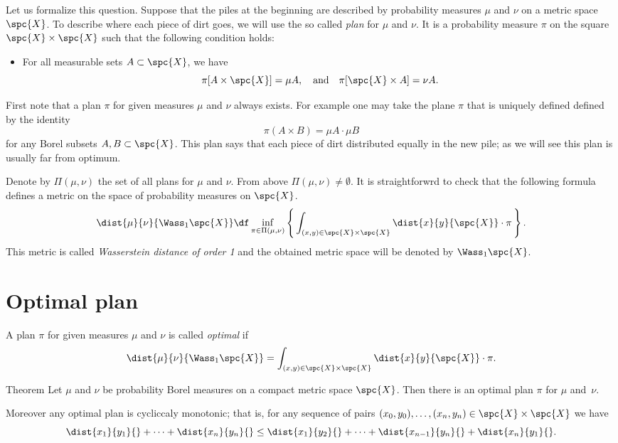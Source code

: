Let us formalize this question.
Suppose that the piles at the beginning are described by probability measures $\mu$ and $\nu$ on a metric space~$\spc{X}$.
To describe where each piece of dirt goes, we will use the so called \emph{plan} for $\mu$ and $\nu$.
It is a probability measure $\pi$ on the square $\spc{X}\times\spc{X}$ such that the following condition holds:
\begin{itemize}
\item For all measurable sets $A \subset \spc{X}$, we have 
\[\pi [A \times \spc{X}] = \mu A,\quad\text{and}\quad \pi [  \spc{X}\times A] = \nu A.\]
\end{itemize}

First note that a plan $\pi$ for given measures $\mu$ and $\nu$ always exists.
For example one may take the plane $\pi$ that is uniquely defined  defined by the identity
\[\pi(A\times B)=\mu A\cdot \mu B\]
for any Borel subsets $A,B\subset\spc{X}$.
This plan says that each piece of dirt distributed equally in the new pile; as we will see this plan is usually far from optimum.

Denote by $\Pi(\mu,\nu)$ the set of all plans for $\mu$ and $\nu$.
From above $\Pi(\mu,\nu)\ne\emptyset$.
It is straightforwrd to check that the following formula defines a metric on the space of probability measures on $\spc{X}$.
\[\dist{\mu}{\nu}{\Wass_1\spc{X}}
\df
\inf_{\pi\in\Pi(\mu,\nu)}
\left\{\,\int_{(x,y)\in\spc{X}\times\spc{X}}\dist{x}{y}{\spc{X}}\cdot\pi\,\right\}.\]
This metric is called \emph{Wasserstein distance of order 1} and the obtained metric space will be denoted by $\Wass_1\spc{X}$.

\section{Optimal plan}

A plan $\pi$ for given measures $\mu$ and $\nu$ is called \emph{optimal} if 
\[\dist{\mu}{\nu}{\Wass_1\spc{X}}
=\int_{(x,y)\in\spc{X}\times\spc{X}}\dist{x}{y}{\spc{X}}\cdot\pi.\]

\begin{thm}{Theorem}
Let $\mu$ and $\nu$ be probability Borel measures on a compact metric space $\spc{X}$.
Then there is an optimal plan $\pi$ for $\mu$ and~$\nu$.

Moreover any optimal plan is cycliccaly monotonic;
that is, for any sequence of pairs $(x_0,y_0),\dots,(x_n,y_n)\in\spc{X}\times\spc{X}$ we have
\[\dist{x_1}{y_1}{}+\dots+\dist{x_n}{y_n}{}
\le
\dist{x_1}{y_2}{}+\dots+\dist{x_{n-1}}{y_n}{}+\dist{x_{n}}{y_1}{}.\]
\end{thm}

